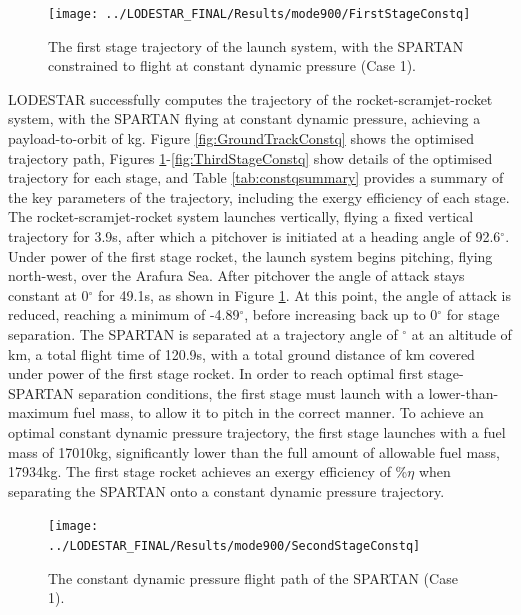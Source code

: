 \begin{figure}[ht!]
	\centering
	\texttt{[image: ../LODESTAR\_FINAL/Results/mode900/FirstStageConstq]}
	\caption{The first stage trajectory of the launch system, with the SPARTAN constrained to flight at constant dynamic pressure (Case 1).}
	\label{fig:FirstStageConstq}
\end{figure}
LODESTAR successfully computes the trajectory of the rocket-scramjet-rocket system, with the SPARTAN flying at constant dynamic pressure, achieving a payload-to-orbit of \PayloadToOrbitConstqNoReturn kg.
Figure \ref{fig:GroundTrackConstq} shows the optimised trajectory path, Figures \ref{fig:FirstStageConstq}-\ref{fig:ThirdStageConstq} show details of the optimised trajectory for each stage, and Table \ref{tab:constqsummary} provides a summary of the key parameters of the trajectory, including the exergy efficiency of each stage.
The rocket-scramjet-rocket system launches vertically, flying a fixed vertical trajectory for 3.9s, after which a pitchover is initiated at a heading angle of 92.6$^\circ$. Under power of the first stage rocket, the launch system begins pitching, flying north-west, over the Arafura Sea. 
After pitchover the angle of attack stays constant at 0$^\circ$ for 49.1s, as shown in Figure \ref{fig:FirstStageConstq}. At this point, the angle of attack is reduced, reaching a minimum of -4.89$^\circ$, before increasing back up to 0$^\circ$ for stage separation. 
The SPARTAN is separated at a trajectory angle of \firstsecondSeparationgammaConstqNoReturn$^\circ$ at an altitude of \firstsecondSeparationAltConstqNoReturn km, a total flight time of 120.9s, with a total ground distance of \FirstStageDistStandardNoReturn km covered under power of the first stage rocket. 
 In order to reach optimal first stage-SPARTAN separation conditions, the first stage must launch with a lower-than-maximum fuel mass, to allow it to pitch in the correct manner. To achieve an optimal constant dynamic pressure trajectory, the first stage launches with a fuel mass of 17010kg, significantly lower than the full amount of allowable fuel mass, 17934kg. 
The first stage rocket achieves an exergy efficiency of \firstExergyEffConstqNoReturn\%$\eta$ when separating the SPARTAN onto a constant dynamic pressure trajectory. 


\begin{figure}[ht!]
\centering
\texttt{[image: ../LODESTAR\_FINAL/Results/mode900/SecondStageConstq]}
\caption{The constant dynamic pressure flight path of the SPARTAN (Case 1).}
\label{fig:SecondStageConstq}
\end{figure}


